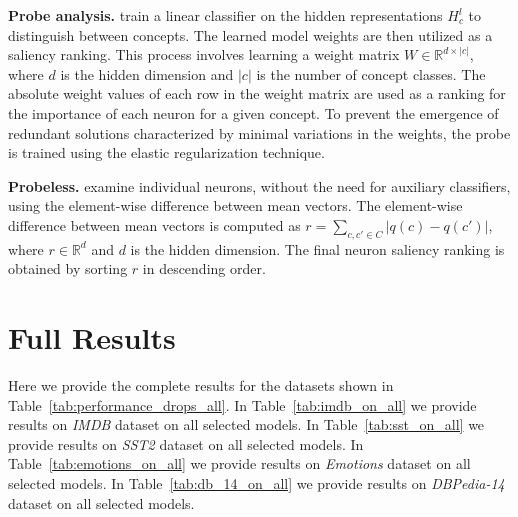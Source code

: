 \textbf{Probe analysis.} \citet{grain:aaai19-1} train a linear classifier on the hidden representations \( H^l_c \) to distinguish between concepts. The learned model weights are then utilized as a saliency ranking. This process involves learning a weight matrix \( W \in \mathbb{R}^{d \times |c|} \), where \( d \) is the hidden dimension and \( |c| \) is the number of concept classes. The absolute weight values of each row in the weight matrix are used as a ranking for the importance of each neuron for a given concept. To prevent the emergence of redundant solutions characterized by minimal variations in the weights, the probe is trained using the elastic regularization technique.

 \textbf{Probeless.} \citet{AntvergB22} examine individual neurons, without the need for auxiliary classifiers, using the element-wise difference between mean vectors. The element-wise difference between mean vectors is computed as $r = \sum_{c,c'\in C} |q(c) - q(c')|$, where $r \in \mathbb{R}^d$ and $d$ is the hidden dimension. The final neuron saliency ranking is obtained by sorting $r$ in descending order.





\section{Full Results}
Here we provide the complete results for the datasets shown in Table~\ref{tab:performance_drops_all}. In Table~\ref{tab:imdb_on_all} we provide results on \textit{IMDB} dataset on all selected models. In Table~\ref{tab:sst_on_all} we provide results on \textit{SST2} dataset on all selected models. In Table~\ref{tab:emotions_on_all} we provide results on \textit{Emotions} dataset on all selected models. In Table~\ref{tab:db_14_on_all} we provide results on \textit{DBPedia-14} dataset on all selected models.

